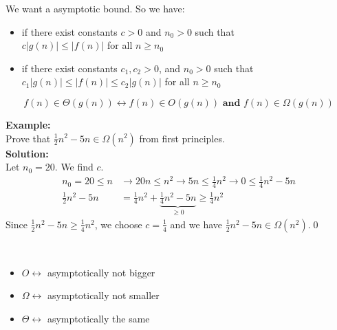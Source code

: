 \documentclass[letterpaper, 12pt]{article}
\newcommand{\red}[1]{{\color{red}{#1}}}
\begin{document}
    \bigskip
    We want a \textbf{\red{tight}} asymptotic bound. So we have:\\
    \red{$\Omega$-notation}
    \begin{itemize}
        \item \red{$f(n) \in \Omega (g(n))$} if there exist constants $c > 0$ and $n_0 > 0$ such that\\
        $c|g(n)| \leq |f(n)|$ for all $n \geq n_0$
    \end{itemize}
    \red{$\Theta$-notation}
    \begin{itemize}
        \item \red{$f(n) \in \Theta (g(n))$} if there exist constants $c_1, c_2 > 0$, and $n_0 > 0$ such that\\
        $c_1|g(n)| \leq |f(n)| \leq c_2|g(n)|$ for all $n \geq n_0$
    \end{itemize}
    \red{Notice:}
    $$f(n) \in \Theta (g(n)) \longleftrightarrow f(n) \in O(g(n)) \textbf{ and } f(n) \in \Omega (g(n))$$
    \pagebreak
    
    \textbf{Example:}\\
    Prove that $\frac{1}{2}n^2 - 5n \in \Omega (n^2)$ from first principles.\\
    \bigskip
    \textbf{Solution:}\\
    Let $n_0 = 20$. We find $c$.\\
    \begin{align*}
        n_0 = 20 \leq n &\rightarrow 20n \leq n^2 \rightarrow 5n \leq \frac{1}{4}n^2 \rightarrow 0 \leq \frac{1}{4}n^2 - 5n\\
        \frac{1}{2}n^2 - 5n &= \frac{1}{4}n^2 + \underbrace{\frac{1}{4}n^2 - 5n}_{\geq 0} \geq \frac{1}{4}n^2
    \end{align*}
    Since $\frac{1}{2}n^2 - 5n \geq \frac{1}{4}n^2$, we choose $c = \frac{1}{4}$ and we have $\frac{1}{2}n^2 - 5n \in \Omega (n^2)$.\qed\\
    \bigskip
    
    \textbf{\red{Quick Summary:}}\\
    \begin{itemize}
        \item $O \leftrightarrow$ asymptotically not bigger
        \item $\Omega \leftrightarrow$ asymptotically not smaller
        \item $\Theta \leftrightarrow$ asymptotically the same
    \end{itemize}
\end{document}
